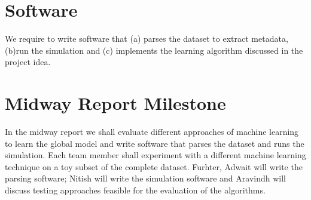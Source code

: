 \documentclass{article} %
\begin{document}
\section{Software}
We require to write software that (a) parses the dataset to extract metadata, (b)run the simulation and (c) implements the learning algorithm discussed in the project idea.

\section{Midway Report Milestone}
In the midway report we shall evaluate different approaches of machine learning to learn the global model and write software that parses the dataset and runs the simulation. Each team member shall experiment with a different machine learning technique on a toy subset of the complete dataset. Furhter, Adwait will write the parsing software; Nitish will write the simulation software and Aravindh will discuss testing approaches feasible for the evaluation of the algorithms.
\end{document}
